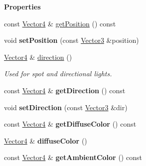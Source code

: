 \begin{Indent}\textbf{ Properties}\par
\begin{DoxyCompactItemize}
\item 
const \mbox{\hyperlink{classrev_1_1_vector}{Vector4}} \& \mbox{\hyperlink{classrev_1_1_light_a1f68077994136c1c7496955a51e56cc0}{get\+Position}} () const
\item 
\mbox{\label{classrev_1_1_light_aa543a2990fbe15517b2adab9dc214342}} 
void {\bfseries set\+Position} (const \mbox{\hyperlink{classrev_1_1_vector}{Vector3}} \&position)
\item 
\mbox{\label{classrev_1_1_light_adc9992832658c63f12ec8363e19b80fa}} 
\mbox{\hyperlink{classrev_1_1_vector}{Vector4}} \& \mbox{\hyperlink{classrev_1_1_light_adc9992832658c63f12ec8363e19b80fa}{direction}} ()
\begin{DoxyCompactList}\small\item\em Used for spot and directional lights. \end{DoxyCompactList}\item 
\mbox{\label{classrev_1_1_light_a9885cd42b5b892213fb12a8175a4ea73}} 
const \mbox{\hyperlink{classrev_1_1_vector}{Vector4}} \& {\bfseries get\+Direction} () const
\item 
\mbox{\label{classrev_1_1_light_aa2d5f8286ea8f484d0bffa85baf08c09}} 
void {\bfseries set\+Direction} (const \mbox{\hyperlink{classrev_1_1_vector}{Vector3}} \&dir)
\item 
\mbox{\label{classrev_1_1_light_af30b1c7c5840fab9c57109b7dcd8b724}} 
const \mbox{\hyperlink{classrev_1_1_vector}{Vector4}} \& {\bfseries get\+Diffuse\+Color} () const
\item 
\mbox{\label{classrev_1_1_light_afa4a28ab1a886cc8c203f63dd41e8c8b}} 
\mbox{\hyperlink{classrev_1_1_vector}{Vector4}} \& {\bfseries diffuse\+Color} ()
\item 
\mbox{\label{classrev_1_1_light_a256a3cbb04876f5ce932c5a70ea339a8}} 
const \mbox{\hyperlink{classrev_1_1_vector}{Vector4}} \& {\bfseries get\+Ambient\+Color} () const
\item 

\end{DoxyCompactItemize}
\end{Indent}
